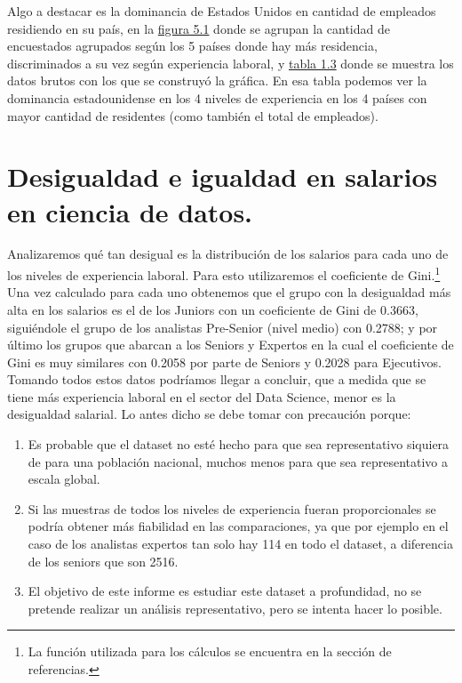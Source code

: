 \documentclass{article}
\begin{document}
Algo a destacar es la dominancia de Estados Unidos en cantidad de empleados residiendo en su país, en la \hyperref[figura 5.1 grafico de barras agrupado]{figura 5.1} donde se agrupan la cantidad de encuestados agrupados según los 5 países donde hay más residencia, discriminados a su vez según experiencia laboral, y \hyperref[tabla 1.3]{tabla 1.3} donde se muestra los datos brutos con los que se construyó la gráfica. En esa tabla podemos ver la dominancia estadounidense en los 4 niveles de experiencia en los 4 países con mayor cantidad de residentes (como también el total de empleados).
	\section{Desigualdad e igualdad en salarios en ciencia de datos.}
	Analizaremos qué tan desigual es la distribución de los salarios para cada uno de los niveles de experiencia laboral. Para esto utilizaremos el coeficiente de Gini.\footnote{La función utilizada para los cálculos se encuentra en la sección de referencias.}
	Una vez calculado para cada uno obtenemos que el grupo con la desigualdad más alta en los salarios es el de los Juniors con un coeficiente de Gini de 0.3663, siguiéndole el grupo de los analistas Pre-Senior (nivel medio) con 0.2788; y por último los grupos que abarcan a los Seniors y Expertos en la cual el coeficiente de Gini es muy similares con 0.2058 por parte de Seniors y 0.2028 para Ejecutivos. Tomando todos estos datos podríamos llegar a concluir, que a medida que se tiene más experiencia laboral en el sector del Data Science, menor es la desigualdad salarial. Lo antes dicho se debe tomar con  precaución porque:
	\begin{enumerate}
		\item Es probable que el dataset no esté hecho para que sea representativo siquiera de para una población nacional, muchos menos para que sea representativo a escala global.
		\item Si las muestras de todos los niveles de experiencia fueran proporcionales se podría obtener más fiabilidad en las comparaciones, ya que por ejemplo en el caso de los analistas expertos tan solo hay 114 en todo el dataset, a diferencia de los seniors que son 2516.
		\item El objetivo de este informe es estudiar este dataset a profundidad, no se pretende realizar un análisis representativo, pero se intenta hacer lo posible.
	\end{enumerate}
\end{document}
